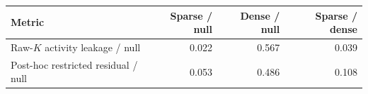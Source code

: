 \begin{tabular}{lrrr}
\toprule
Metric & Sparse / null & Dense / null & Sparse / dense \\
\midrule
Raw-$K$ activity leakage / null & 0.022 & 0.567 & 0.039 \\
Post-hoc restricted residual / null & 0.053 & 0.486 & 0.108 \\
\bottomrule
\end{tabular}
